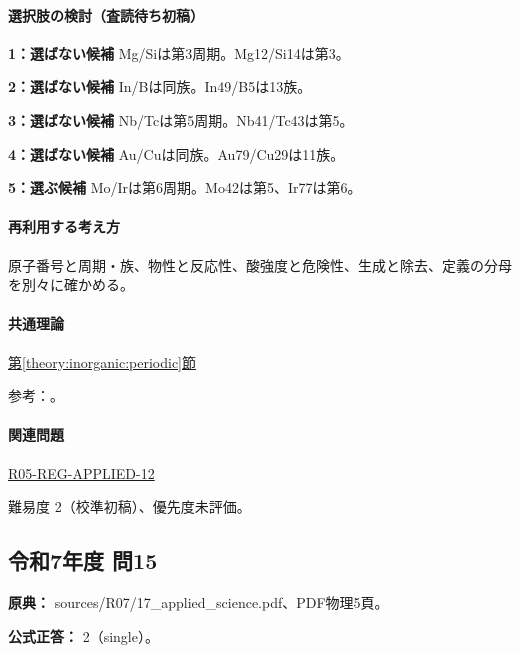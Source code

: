 \paragraph{選択肢の検討（査読待ち初稿）}\mbox{}\par

\noindent\textbf{1：選ばない候補} Mg/Siは第3周期。Mg12/Si14は第3。\par

\noindent\textbf{2：選ばない候補} In/Bは同族。In49/B5は13族。\par

\noindent\textbf{3：選ばない候補} Nb/Tcは第5周期。Nb41/Tc43は第5。\par

\noindent\textbf{4：選ばない候補} Au/Cuは同族。Au79/Cu29は11族。\par

\noindent\textbf{5：選ぶ候補} Mo/Irは第6周期。Mo42は第5、Ir77は第6。\par

\paragraph{再利用する考え方} 原子番号と周期・族、物性と反応性、酸強度と危険性、生成と除去、定義の分母を別々に確かめる。

\paragraph{共通理論} \hyperref[theory:inorganic:periodic]{第\ref*{theory:inorganic:periodic}節}

\par 参考：\cite{atomic_nist2019}。

\paragraph{関連問題} \hyperref[q:r05-reg-applied-12]{R05-REG-APPLIED-12}

\par 難易度 2（校準初稿）、優先度未評価。

\subsection{令和7年度 問15}
\label{q:r07-reg-applied-15}

\noindent\textbf{原典：} sources/R07/17\_applied\_science.pdf、PDF物理5頁。

\textbf{公式正答：} 2（single）。

